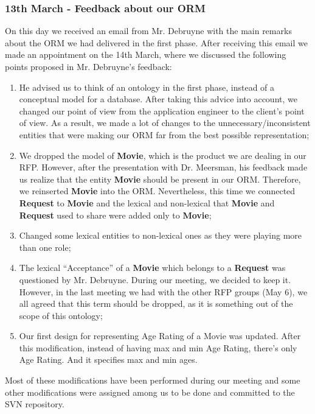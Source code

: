 \documentclass[a4paper,10pt]{article}
\begin{document}
\subsubsection*{13th  March - Feedback about our ORM}
On this day we received an email from Mr. Debruyne with the main remarks about the ORM we had delivered in the first phase. After receiving this email we made an appointment on the 14th March, where we discussed the following points proposed in Mr. Debruyne's feedback:
\begin{enumerate}	
  \item He advised us to think of an ontology in the first phase, instead of a conceptual model for a database. After taking this advice into account, we changed our point of view from the application engineer to the client's point of view. As a result, we made a lot of changes to the unnecessary/inconsistent entities that were making our ORM far from the best possible representation;
  \item We dropped the model of \textbf{Movie}, which is the product we are dealing in our RFP. However, after the presentation with Dr. Meersman, his feedback made us realize that the entity \textbf{Movie} should be present in our ORM. Therefore, we reinserted \textbf{Movie} into the ORM. Nevertheless, this time we connected \textbf{Request} to \textbf{Movie} and the lexical and non-lexical that \textbf{Movie} and \textbf{Request} used to share were added only to \textbf{Movie};
  \item Changed some lexical entities to non-lexical ones as they were playing more than one role;
  \item The lexical ``Acceptance'' of a \textbf{Movie} which belongs to a \textbf{Request} was questioned by Mr. Debruyne. During our meeting, we decided to keep it. However, in the last meeting we had with the other RFP groups (May 6), we all agreed that this term should be dropped, as it is something out of the scope of this ontology;
  \item Our first design for representing Age Rating of a Movie was updated. After this modification, instead of having max and min Age Rating, there's only Age Rating. And it specifies max and min ages.
\end{enumerate}
Most of these modifications have been performed during our meeting and some other modifications were assigned among us to be done and committed to the SVN repository.
\end{document}
